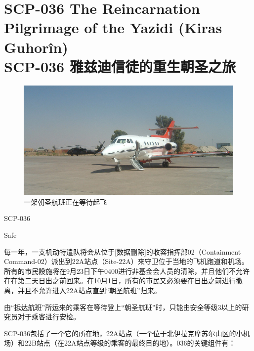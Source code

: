 \chapter[SCP-036 雅兹迪信徒的重生朝圣之旅]{
    SCP-036 The Reincarnation Pilgrimage of the Yazidi (Kiras Guhorîn)\\
    SCP-036 雅兹迪信徒的重生朝圣之旅
}

\label{chap:SCP-036}

\begin{figure}[H]
    \centering
    \includegraphics[width=0.5\linewidth]{images/SCP-036.jpg}
    \caption*{一架朝圣航班正在等待起飞}
\end{figure}

SCP-036

Safe

每一年，一支机动特遣队将会从位于{[}数据删除]的收容指挥部02（Containment Command-02）派出到22A站点（Site-22A）来守卫位于当地的飞机跑道和机场。所有的市民設施将在9月23日下午0400进行非基金会人员的清除，并且他们不允许在在第二天日出之前回来。在10月1日，所有的市民又必须要在日出之前进行撤离，并且不允许进入22A站点直到“朝圣航班”归来。

由“抵达航班”所运来的乘客在等待登上“朝圣航班”时，只能由安全等级3以上的研究员对于乘客进行安检。

SCP-036包括了一个它的所在地，22A站点（一个位于北伊拉克摩苏尔山区的小机场）和22B站点（在22A站点等级的乘客的最终目的地）。036的关键组件有：

